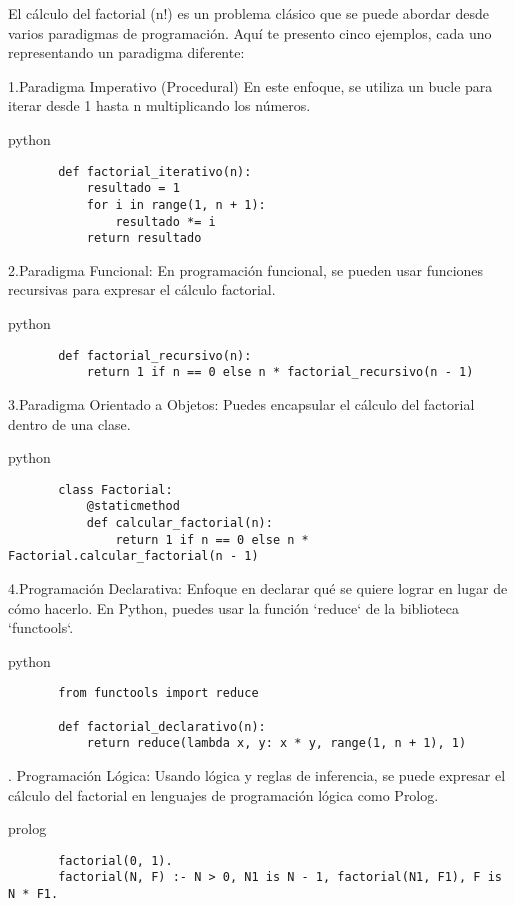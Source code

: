  \noindent El cálculo del factorial (n!) es un problema clásico que se puede abordar desde varios paradigmas de programación. Aquí te presento cinco ejemplos, cada uno representando un paradigma diferente:

\noindent 1.Paradigma Imperativo (Procedural)
   En este enfoque, se utiliza un bucle para iterar desde 1 hasta n multiplicando los números.

   python
   \begin{verbatim}
       def factorial_iterativo(n):
           resultado = 1
           for i in range(1, n + 1):
               resultado *= i
           return resultado
  \end{verbatim}

\noindent 2.Paradigma Funcional:
   En programación funcional, se pueden usar funciones recursivas para expresar el cálculo factorial.

   python
   \begin{verbatim}
       def factorial_recursivo(n):
           return 1 if n == 0 else n * factorial_recursivo(n - 1)
   \end{verbatim}

\noindent 3.Paradigma Orientado a Objetos:
   Puedes encapsular el cálculo del factorial dentro de una clase.

   python
   \begin{verbatim}
       class Factorial:
           @staticmethod
           def calcular_factorial(n):
               return 1 if n == 0 else n * Factorial.calcular_factorial(n - 1)
   \end{verbatim}

\noindent 4.Programación Declarativa:
   Enfoque en declarar qué se quiere lograr en lugar de cómo hacerlo. En Python, puedes usar la función `reduce` de la biblioteca `functools`.

   python
   \begin{verbatim}
       from functools import reduce
    
       def factorial_declarativo(n):
           return reduce(lambda x, y: x * y, range(1, n + 1), 1)
   \end{verbatim}

. Programación Lógica:
   Usando lógica y reglas de inferencia, se puede expresar el cálculo del factorial en lenguajes de programación lógica como Prolog.

   prolog
   \begin{verbatim}
       factorial(0, 1).
       factorial(N, F) :- N > 0, N1 is N - 1, factorial(N1, F1), F is N * F1.
   \end{verbatim}

